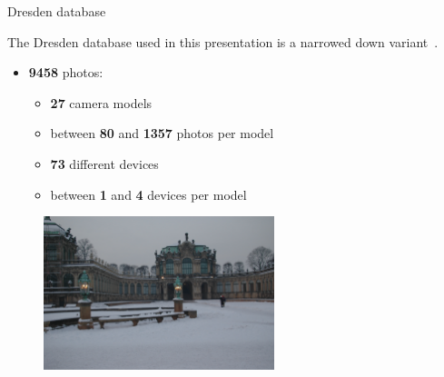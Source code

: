 \begin{frame}{Dresden database}

    The Dresden database used in this presentation is a narrowed down variant~\cite{dresden}.
    
    \begin{itemize}
        \item<2-> \textbf{9458} photos: \begin{itemize}
            \item<3-> \textbf{27} camera models
            \item<3-> between \textbf{80} and \textbf{1357} photos per model
            \item<4-> \textbf{73} different devices
            \item<4-> between \textbf{1} and \textbf{4} devices per model
        \end{itemize}
    \end{itemize}

    \begin{figure}
        \centering
        \includegraphics[width=0.6\textwidth]{../drawable/examples/example-dresden-D70_0_19451.JPG}
    \end{figure}
    
\end{frame}

